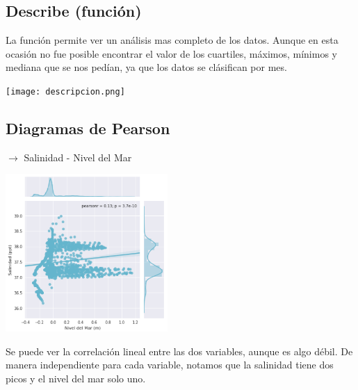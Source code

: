 \documentclass[12pt]{article}
\begin{document}
\subsection*{Describe (función)}
La función permite ver un análisis mas completo de los datos. Aunque en esta ocasión no fue posible encontrar el valor de los cuartiles, máximos, mínimos y mediana que se nos pedían, ya que los datos se clásifican por mes.
\begin{center}
	\texttt{[image: descripcion.png]}
\end{center}
\subsection*{Diagramas de Pearson}
$\rightarrow$ Salinidad - Nivel del Mar
\begin{center}
	\includegraphics[height=6cm]{gc1.png}
\end{center}
Se puede ver la correlación lineal entre las dos variables, aunque es algo débil. De manera independiente para cada variable, notamos que la salinidad tiene dos picos y el nivel del mar solo uno. \\
\end{document}
